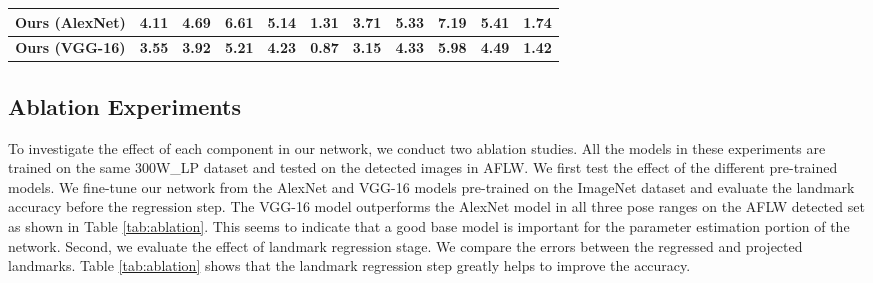 \documentclass[10pt,twocolumn,letterpaper]{article}
\begin{document}
\begin{table*}[t!]
\begin{tabular}{|c||c|c|c|c|c||c|c|c|c|c|}
\hline
\textbf{Ours (AlexNet)} &\textbf{4.11} & \textbf{4.69} & 6.61 & \textbf{5.14} & 1.31 & 3.71 & 5.33 & 7.19 & 5.41 & \textbf{1.74} \\ \hline
\textbf{Ours (VGG-16)} & \textbf{3.55} & \textbf{3.92} & \textbf{5.21} & \textbf{4.23} & \textbf{0.87} & \textbf{3.15} & \textbf{4.33} & \textbf{5.98} & \textbf{4.49} & \textbf{1.42}  \\ \hline
\end{tabular}
\end{table*}

\subsection{Ablation Experiments}
To investigate the effect of each component in our network, we conduct two ablation studies. All the models in these experiments are trained on the same 300W\_LP dataset and tested on the detected images in AFLW. We first test the effect of the different pre-trained models. We fine-tune our network from the AlexNet and VGG-16 models pre-trained on the ImageNet dataset and evaluate the landmark accuracy before the regression step. The VGG-16 model outperforms the AlexNet model in all three pose ranges on the AFLW detected set as shown in Table \ref{tab:ablation}. This seems to indicate that a good base model is important for the parameter estimation portion of the network. Second, we evaluate the effect of landmark regression stage. We compare the errors between the regressed and projected landmarks. Table \ref{tab:ablation} shows that the landmark regression step greatly helps to improve the accuracy.
\end{document}
